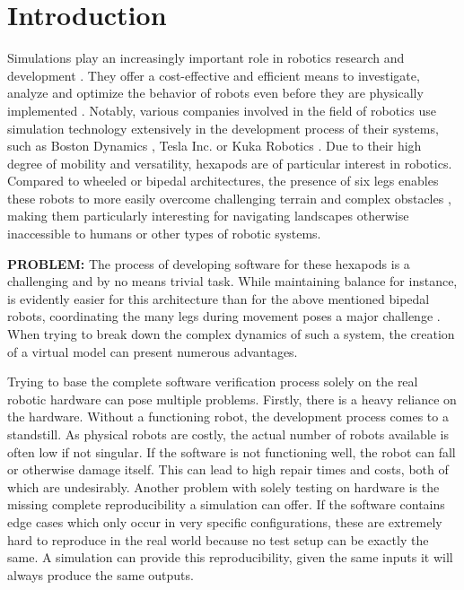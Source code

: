 \chapter{Introduction}
\label{ch:introduction}


Simulations play an increasingly important role in robotics research and development \parencite{afzal2020study}. 
They offer a cost-effective and efficient means to investigate, analyze and optimize the behavior of robots even before they are physically implemented \parencite{de2019analysis}. 
Notably, various companies involved in the field of robotics use simulation technology extensively in the development process of their systems, such as Boston Dynamics \parencite{BostonDynamicsSimulation}, Tesla Inc. \parencite{TeslaAiDay2022} or Kuka Robotics \parencite{KukaSim}.
Due to their high degree of mobility and versatility, hexapods are of particular interest in robotics. 
Compared to wheeled or bipedal architectures, the presence of six legs enables these robots to more easily overcome challenging terrain and complex obstacles \parencite{barai2013smart, atifystructure}, making them particularly interesting for navigating landscapes otherwise inaccessible to humans or other types of robotic systems.

\textbf{PROBLEM:}
The process of developing software for these hexapods is a challenging and by no means trivial task.
While maintaining balance for instance, is evidently easier for this architecture than for the above mentioned bipedal robots, coordinating the many legs during movement poses a major challenge \parencite{azayev2020blind,schilling2013walknet}.
When trying to break down the complex dynamics of such a system, the creation of a virtual model can present 
numerous advantages.

Trying to base the complete software verification process solely on the real robotic hardware can pose multiple problems.
Firstly, there is a heavy reliance on the hardware.
Without a functioning robot, the development process comes to a standstill.
As physical robots are costly, the actual number of robots available is often low if not singular.
If the software is not functioning well, the robot can fall or otherwise damage itself.
This can lead to high repair times and costs, both of which are undesirably.
Another problem with solely testing on hardware is the missing complete reproducibility a simulation can offer.
If the software contains edge cases which only occur in very specific configurations, these are extremely hard to reproduce in the real world because no test setup can be exactly the same.
A simulation can provide this reproducibility, given the same inputs it will always produce the same outputs.

